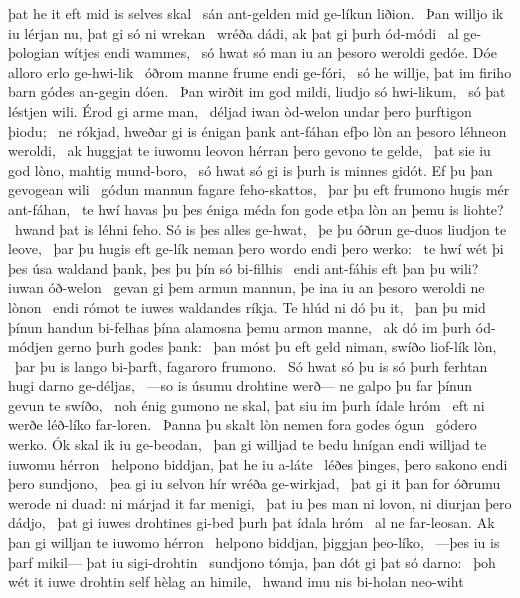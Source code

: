 þat he it eft mid is selves skal \hld\ sán ant-gelden
mid ge-líkun liðion. \hld\ Þan willjo ik iu lérjan nu,
þat gi só ni wrekan \hld\ wréða dádi,
ak þat gi þurh ód-módi \hld\ al ge-þologian
wítjes endi wammes, \hld\ só hwat só man iu an þesoro weroldi gedóe.
Dóe alloro erlo ge-hwi-lik \hld\ óðrom manne
frume endi ge-fóri, \hld\ só he willje, þat im firiho barn
gódes an-gegin dóen. \hld\ Þan wirðit im god mildi,
liudjo só hwi-likum, \hld\ só þat léstjen wili.
Érod gi arme man, \hld\ déljad iwan òd-welon
undar þero þurftigon þiodu; \hld\ ne rókjad, hweðar gi is énigan þank ant-fáhan
efþo lòn an þesoro léhneon weroldi, \hld\ ak huggjat te iuwomu leovon hérran
þero gevono te gelde, \hld\ þat sie iu god lòno,
mahtig mund-boro, \hld\ só hwat só gi is þurh is minnes gidót.
Ef þu þan gevogean wili \hld\ gódun mannun
fagare feho-skattos, \hld\ þar þu eft frumono hugis
mér ant-fáhan, \hld\ te hwí havas þu þes éniga méda fon gode
etþa lòn an þemu is liohte? \hld\ hwand þat is léhni feho.
Só is þes alles ge-hwat, \hld\ þe þu óðrun ge-duos
liudjon te leove, \hld\ þar þu hugis eft ge-lík neman
þero wordo endi þero werko: \hld\ te hwí wét þi þes úsa waldand þank,
þes þu þín só bi-filhis \hld\ endi ant-fáhis eft þan þu wili?
iuwan óð-welon \hld\ gevan gi þem armun mannun,
þe ina iu an þesoro weroldi ne lònon \hld\ endi rómot te iuwes waldandes ríkja.
Te hlúd ni dó þu it, \hld\ þan þu mid þínun handun bi-felhas
þína alamosna þemu armon manne, \hld\ ak dó im þurh ód-módjen
gerno þurh godes þank: \hld\ þan móst þu eft geld niman,
swíðo liof-lík lòn, \hld\ þar þu is lango bi-þarft,
fagaroro frumono. \hld\ Só hwat só þu is só þurh ferhtan hugi
darno ge-déljas, \hld\ —so is úsumu drohtine werð—
ne galpo þu far þínun gevun te swíðo, \hld\ noh énig gumono ne skal,
þat siu im þurh ídale hróm \hld\ eft ni werðe
léð-líko far-loren. \hld\ Þanna þu skalt lòn nemen
fora godes ógun \hld\ gódero werko.
Ók skal ik iu ge-beodan, \hld\ þan gi willjad te bedu hnígan
endi willjad te iuwomu hérron \hld\ helpono biddjan,
þat he iu a-láte \hld\ léðes þinges,
þero sakono endi þero sundjono, \hld\ þea gi iu selvon hír
wréða ge-wirkjad, \hld\ þat gi it þan for óðrumu werode ni duad:
ni márjad it far menigi, \hld\ þat iu þes man ni lovon,
ni diurjan þero dádjo, \hld\ þat gi iuwes drohtines gi-bed
þurh þat ídala hróm \hld\ al ne far-leosan.
Ak þan gi willjan te iuwomo hérron \hld\ helpono biddjan,
þiggjan þeo-líko, \hld\ —þes iu is þarf mikil—
þat iu sigi-drohtin \hld\ sundjono tómja,
þan dót gi þat só darno: \hld\ þoh wét it iuwe drohtin self
hèlag an himile, \hld\ hwand imu nis bi-holan neo-wiht
